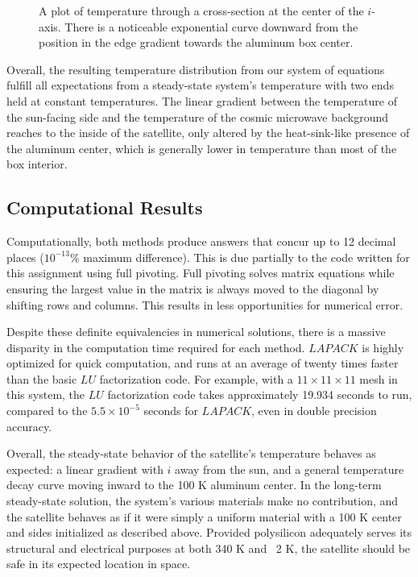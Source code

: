 \documentclass[12pt]{article}
\begin{document}
\begin{figure}[h!]
\begin{center}
\begin{subfigure}{0.6\textwidth}
\caption{\label{centeredi}}
\end{subfigure}
\caption{A plot of temperature through a cross-section at the center of the $i$-axis.  There is a noticeable exponential curve downward from the position in the edge gradient towards the aluminum box center.}
\end{center}
\end{figure}

Overall, the resulting temperature distribution from our system of equations fulfill all expectations from a steady-state system's temperature with two ends held at constant temperatures.  The linear gradient between the temperature of the sun-facing side and the temperature of the cosmic microwave background reaches to the inside of the satellite, only altered by the heat-sink-like presence of the aluminum center, which is generally lower in temperature than most of the box interior.
\subsection*{Computational Results}
Computationally, both methods produce answers that concur up to 12 decimal places ($10^{-13}\%$ maximum difference).  This is due partially to the code written for this assignment using full pivoting.  Full pivoting solves matrix equations while ensuring the largest value in the matrix is always moved to the diagonal by shifting rows and columns.  This results in less opportunities for numerical error.

Despite these definite equivalencies in numerical solutions, there is a massive disparity in the computation time required for each method.  $LAPACK$ is highly optimized for quick computation, and runs at an average of twenty times faster than the basic $LU$ factorization code.  For example, with a $11\times 11\times 11$ mesh in this system, the $LU$ factorization code takes approximately 19.934 seconds to run, compared to the $5.5\times 10^{-5}$ seconds for $LAPACK$, even in double precision accuracy.

Overall, the steady-state behavior of the satellite's temperature behaves as expected: a linear gradient with $i$ away from the sun, and a general temperature decay curve moving inward to the 100 K aluminum center.  In the long-term steady-state solution, the system's various materials make no contribution, and the satellite behaves as if it were simply a uniform material with a 100 K center and sides initialized as described above.  Provided polysilicon adequately serves its structural and electrical purposes at both 340 K and ~2 K, the satellite should be safe in its expected location in space.
\end{document}
